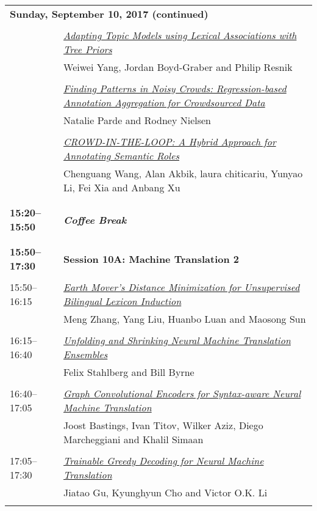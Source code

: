 \begin{tabular}{p{20mm}p{128mm}}
\\
\multicolumn{2}{l}{\bf Sunday, September 10, 2017 (continued)} \\\\
 & \hyperlink{page.1901}{\em Adapting Topic Models using Lexical Associations with Tree Priors}\\
         & Weiwei Yang, Jordan Boyd-Graber and Philip Resnik \\
\\

 & \hyperlink{page.1907}{\em Finding Patterns in Noisy Crowds: Regression-based Annotation Aggregation for Crowdsourced Data}\\
         & Natalie Parde and Rodney Nielsen \\
\\

 & \hyperlink{page.1913}{\em CROWD-IN-THE-LOOP: A Hybrid Approach for Annotating Semantic Roles}\\
         & Chenguang Wang, Alan Akbik, laura chiticariu, Yunyao Li, Fei Xia and Anbang Xu \\
\\

\\{\bf 15:20--15:50} & {\bf\em Coffee Break} \\
\\
\\{\bf 15:50--17:30} & {\bf Session 10A: Machine Translation 2 } \\
\\
15:50--16:15 & \hyperlink{page.1923}{\em Earth Mover's Distance Minimization for Unsupervised Bilingual Lexicon Induction}\\
         & Meng Zhang, Yang Liu, Huanbo Luan and Maosong Sun \\
\\

16:15--16:40 & \hyperlink{page.1935}{\em Unfolding and Shrinking Neural Machine Translation Ensembles}\\
         & Felix Stahlberg and Bill Byrne \\
\\

16:40--17:05 & \hyperlink{page.1946}{\em Graph Convolutional Encoders for Syntax-aware Neural Machine Translation}\\
         & Joost Bastings, Ivan Titov, Wilker Aziz, Diego Marcheggiani and Khalil Simaan \\
\\

17:05--17:30 & \hyperlink{page.1957}{\em Trainable Greedy Decoding for Neural Machine Translation}\\
         & Jiatao Gu, Kyunghyun Cho and Victor O.K. Li \\
\\

\end{tabular}
